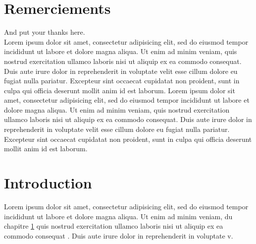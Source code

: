 \documentclass[a4paper, oneside, frenchb]{report}
\begin{document}
\chapter*{Remerciements}
\thispagestyle{empty}
%
And put your thanks here. ~\\

Lorem ipsum dolor sit amet, consectetur adipisicing elit, sed do eiusmod
tempor incididunt ut labore et dolore magna aliqua. Ut enim ad minim veniam,
quis nostrud exercitation ullamco laboris nisi ut aliquip ex ea commodo
consequat. Duis aute irure dolor in reprehenderit in voluptate velit esse
cillum dolore eu fugiat nulla pariatur. Excepteur sint occaecat cupidatat non
proident, sunt in culpa qui officia deserunt mollit anim id est laborum. Lorem ipsum dolor sit amet, consectetur adipisicing elit, sed do eiusmod
tempor incididunt ut labore et dolore magna aliqua. Ut enim ad minim veniam,
quis nostrud exercitation ullamco laboris nisi ut aliquip ex ea commodo
consequat. Duis aute irure dolor in reprehenderit in voluptate velit esse
cillum dolore eu fugiat nulla pariatur. Excepteur sint occaecat cupidatat non
proident, sunt in culpa qui officia deserunt mollit anim id est laborum.




\tableofcontents

\chapter{Introduction}
\label{chap:general_intorduction}
%
%


Lorem ipsum dolor sit amet, consectetur adipisicing elit, sed do eiusmod
tempor incididunt ut labore \cite{jenkins2004} et dolore magna aliqua. Ut enim ad minim veniam, du chapitre \ref{chap:general_intorduction}
quis nostrud exercitation ullamco laboris nisi ut aliquip ex ea commodo
consequat \cite{hui}. Duis aute irure dolor in reprehenderit in voluptate v.
\end{document}
